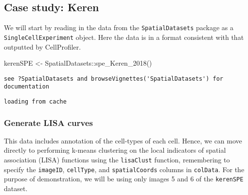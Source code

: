 \documentclass[
  letterpaper,
  DIV=11,
  numbers=noendperiod]{scrreprt}
\newenvironment{Shaded}{\begin{snugshade}}{\end{snugshade}}
\newcommand{\AttributeTok}[1]{\textcolor[rgb]{0.40,0.45,0.13}{#1}}
\newcommand{\DecValTok}[1]{\textcolor[rgb]{0.68,0.00,0.00}{#1}}
\newcommand{\FunctionTok}[1]{\textcolor[rgb]{0.28,0.35,0.67}{#1}}
\newcommand{\NormalTok}[1]{\textcolor[rgb]{0.00,0.23,0.31}{#1}}
\newcommand{\OtherTok}[1]{\textcolor[rgb]{0.00,0.23,0.31}{#1}}
\newcommand{\SpecialCharTok}[1]{\textcolor[rgb]{0.37,0.37,0.37}{#1}}
\newcommand{\StringTok}[1]{\textcolor[rgb]{0.13,0.47,0.30}{#1}}
\begin{document}
\subsection{Case study: Keren}\label{case-study-keren}

We will start by reading in the data from the \texttt{SpatialDatasets}
package as a \texttt{SingleCellExperiment} object. Here the data is in a
format consistent with that outputted by CellProfiler.

\begin{Shaded}
\begin{Highlighting}[]
\NormalTok{kerenSPE }\OtherTok{\textless{}{-}}\NormalTok{ SpatialDatasets}\SpecialCharTok{::}\FunctionTok{spe\_Keren\_2018}\NormalTok{()}
\end{Highlighting}
\end{Shaded}

\begin{verbatim}
see ?SpatialDatasets and browseVignettes('SpatialDatasets') for documentation
\end{verbatim}

\begin{verbatim}
loading from cache
\end{verbatim}

\subsubsection{Generate LISA curves}\label{generate-lisa-curves}

This data includes annotation of the cell-types of each cell. Hence, we
can move directly to performing k-means clustering on the local
indicators of spatial association (LISA) functions using the
\texttt{lisaClust} function, remembering to specify the
\texttt{imageID}, \texttt{cellType}, and \texttt{spatialCoords} columns
in \texttt{colData}. For the purpose of demonstration, we will be using
only images 5 and 6 of the \texttt{kerenSPE} dataset.

\begin{Shaded}
\end{Shaded}
\end{document}
